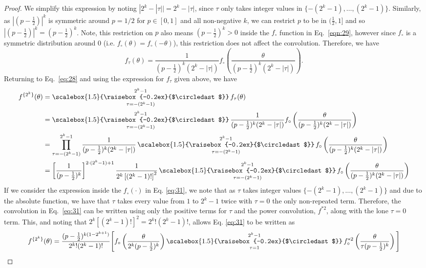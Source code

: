 \documentclass[english]{article}
\newcommand{\Conv}{%
  \mathop{\scalebox{1.5}{\raisebox{-0.2ex}{$\circledast$}}
  }
}
\begin{document}
\begin{proof}
 
 We simplify this expression by noting $|2^k-|\tau||= 2^k-|\tau|$, since $\tau$ only takes integer values in $\{-(2^k-1),\ldots,(2^k-1)\}$.  Similarly, as $|(p-\frac{1}{2})|^k$ is symmetric around $p=1/2$ for $p\in[0,1]$ and all non-negative $k$, we can restrict $p$ to be in $(\frac{1}{2},1]$ and so $|(p-\frac{1}{2})|^k= (p-\frac{1}{2})^k$. Note, this restriction on $p$ also means $(p-\frac{1}{2})^k>0$ inside the $f_\circ$ function in Eq.~\ref{eqn:29}, however since $f_\circ$ is a symmetric distribution around $0$ (i.e. $f_\circ(\theta)=f_\circ(-\theta)$), this restriction does not affect the convolution. 
 Therefore, we have
\begin{equation}
    f_\tau(\theta)=\frac{1}{(p-\frac{1}{2})^k(2^k-\lvert\tau\rvert)}f_\circ\left(\frac{\theta}{(p-\frac{1}{2})^k(2^k-\lvert\tau\rvert)}\right).
\end{equation}
Returning to Eq.~\ref{eq:28} and using the expression for $f_\tau$ given above, we have 
\begin{align}\nonumber
f^{\{2^{k}\}}(\theta)&=\Conv_{\tau=-(2^{k}-1)}^{2^{k}-1} f_{\tau}(\theta)\\\nonumber
&=\Conv_{\tau=-(2^{k}-1)}^{2^{k}-1}\frac{1}{(p-\frac{1}{2})^k(2^k-\lvert\tau\rvert)}f_\circ\left(\frac{\theta}{(p-\frac{1}{2})^k(2^k-\lvert\tau\rvert)}\right)\\\nonumber
&=\prod_{\tau=-(2^{k}-1)}^{2^{k}-1}\frac{1}{(p-\frac{1}{2})^k(2^k-\lvert\tau\rvert)}\Conv_{\tau=-(2^{k}-1)}^{2^{k}-1}f_\circ\left(\frac{\theta}{(p-\frac{1}{2})^k(2^k-\lvert\tau\rvert)}\right)\\
&=\left[\frac{1}{(p-\frac{1}{2})^k}\right]^{2\cdot(2^k-1)+1}\frac{1}{2^k\left[(2^k-1)!\right]^2}\Conv_{\tau=-(2^{k}-1)}^{2^{k}-1}f_\circ\left(\frac{\theta}{(p-\frac{1}{2})^k(2^k-\lvert\tau\rvert)}\right)\label{eq:31}
\end{align}
If we consider the expression inside the $f_\circ(\cdot)$ in Eq. \ref{eq:31}, we note that as $\tau$ takes integer values $\{-(2^k-1),\ldots,(2^k-1)\}$ and due to the absolute function, we have that $\tau$ takes every value from $1$ to $2^k-1$ twice with $\tau=0$ the only non-repeated term.  Therefore, the convolution in Eq.~\ref{eq:31} can be written using only the positive terms for $\tau$ and the power convolution, $f^{*2}$, along with the lone $\tau=0$ term.  This, and noting that $2^k\left[(2^k-1)!\right]^2=2^k!(2^k-1)!$, allows Eq. \ref{eq:31} to be written as 
\begin{equation}
f^{\{2^{k}\}}(\theta)=\frac{(p-\frac{1}{2})^{k(1-2^{k+1})}}{2^k!(2^k-1)!}\Bigg[f_\circ\left(\frac{\theta}{2^k(p-\frac{1}{2})^k}\right) \Conv_{\tau=1}^{2^k-1} f^{*2}_\circ\left(\frac{\theta}{\tau(p-\frac{1}{2})^k}\right)\Bigg]
\end{equation}



\end{proof}
\end{document}
